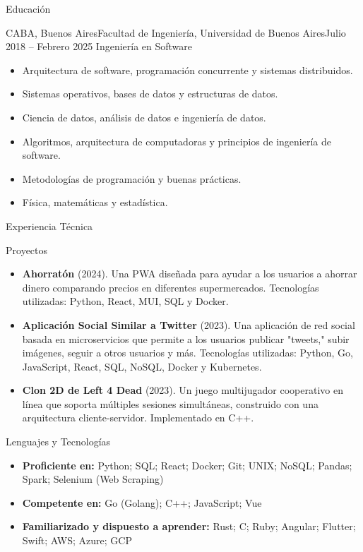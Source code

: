 \documentclass[]{mcdowellcv}
\begin{document}
	\begin{cvsection}{Educación}
		\begin{cvsubsection}{CABA, Buenos Aires}{Facultad de Ingeniería, Universidad de Buenos Aires}{Julio 2018 -- Febrero 2025}
			Ingeniería en Software
			\begin{itemize}
				\item Arquitectura de software, programación concurrente y sistemas distribuidos.
				\item Sistemas operativos, bases de datos y estructuras de datos.
				\item Ciencia de datos, análisis de datos e ingeniería de datos.
				\item Algoritmos, arquitectura de computadoras y principios de ingeniería de software.
				\item Metodologías de programación y buenas prácticas.
				\item Física, matemáticas y estadística.
			\end{itemize}
		\end{cvsubsection}
	\end{cvsection}	
	
	\begin{cvsection}{Experiencia Técnica}
		\begin{cvsubsection}{Proyectos}{}{}
			\begin{itemize}
				\item \textbf{Ahorratón} (2024). Una PWA diseñada para ayudar a los usuarios a ahorrar dinero comparando precios en diferentes supermercados. Tecnologías utilizadas: Python, React, MUI, SQL y Docker.
				\item \textbf{Aplicación Social Similar a Twitter} (2023). Una aplicación de red social basada en microservicios que permite a los usuarios publicar "tweets," subir imágenes, seguir a otros usuarios y más. Tecnologías utilizadas: Python, Go, JavaScript, React, SQL, NoSQL, Docker y Kubernetes.
				\item \textbf{Clon 2D de Left 4 Dead} (2023). Un juego multijugador cooperativo en línea que soporta múltiples sesiones simultáneas, construido con una arquitectura cliente-servidor. Implementado en C++.
			\end{itemize}
		\end{cvsubsection}
	\end{cvsection}
	
	\begin{cvsection}{Lenguajes y Tecnologías}
		\begin{cvsubsection}{}{}{}
			\begin{itemize}
				\item \textbf{Proficiente en:}
				\subitem Python; SQL; React; Docker; Git; UNIX; NoSQL; Pandas; Spark; Selenium (Web Scraping)
				\item \textbf{Competente en:}
				\subitem Go (Golang); C++; JavaScript; Vue
				\item \textbf{Familiarizado y dispuesto a aprender:}
				\subitem Rust; C; Ruby; Angular; Flutter; Swift; AWS; Azure; GCP
			\end{itemize}
		\end{cvsubsection}
	\end{cvsection}
	
	
\end{document}
